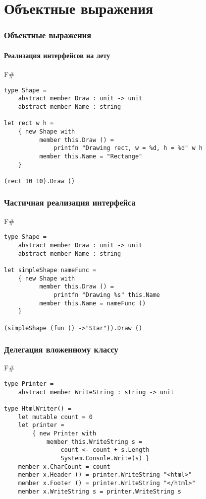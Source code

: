 \documentclass[xetex,mathserif,serif]{beamer}
\begin{document}
    \section{Объектные выражения}
    
   	\begin{frame}[fragile]
   		\frametitle{Объектные выражения}
   		\framesubtitle{Реализация интерфейсов на лету}
   		\begin{exampleblock}{F\#}
   			\begin{lstlisting}
type Shape =
    abstract member Draw : unit -> unit
    abstract member Name : string

let rect w h = 
    { new Shape with
          member this.Draw () = 
              printfn "Drawing rect, w = %d, h = %d" w h
          member this.Name = "Rectange"
    }

(rect 10 10).Draw ()
\end{lstlisting}
\end{exampleblock}
\end{frame}    

   	\begin{frame}[fragile]
   		\frametitle{Частичная реализация интерфейса}
   		\begin{exampleblock}{F\#}
   			\begin{lstlisting}
type Shape =
    abstract member Draw : unit -> unit
    abstract member Name : string

let simpleShape nameFunc = 
    { new Shape with
          member this.Draw () = 
              printfn "Drawing %s" this.Name
          member this.Name = nameFunc ()
    }

(simpleShape (fun () ->"Star")).Draw ()
\end{lstlisting}
\end{exampleblock}
\end{frame}  

   	\begin{frame}[fragile]
   		\frametitle{Делегация вложенному классу}
   		\begin{exampleblock}{F\#}
   			\begin{lstlisting}
type Printer =
    abstract member WriteString : string -> unit

type HtmlWriter() =
    let mutable count = 0
    let printer =
        { new Printer with
            member this.WriteString s =
                count <- count + s.Length
                System.Console.Write(s) }
    member x.CharCount = count
    member x.Header () = printer.WriteString "<html>"
    member x.Footer () = printer.WriteString "</html>"
    member x.WriteString s = printer.WriteString s
\end{lstlisting}
\end{exampleblock}
\end{frame}    
  
\end{document}
